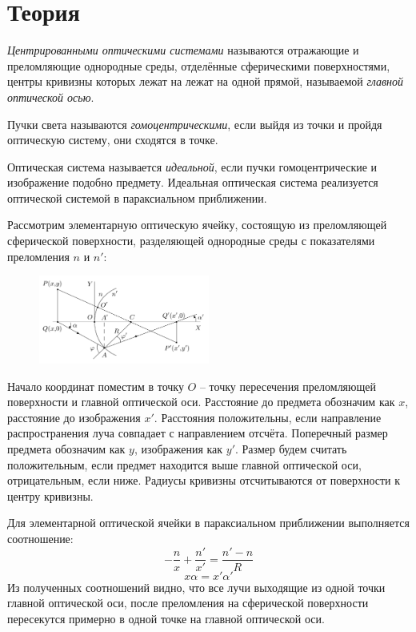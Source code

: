 \section*{Теория}

\textit{Центрированными оптическими системами} называются отражающие и преломляющие однородные среды, отделённые сферическими поверхностями, центры кривизны которых лежат на лежат на одной прямой, называемой \textit{главной оптической осью}.

Пучки света называются \textit{гомоцентрическими}, если выйдя из точки и пройдя оптическую систему, они сходятся в точке.

Оптическая система называется \textit{идеальной}, если пучки гомоцентрические и изображение подобно предмету. Идеальная оптическая система реализуется оптической системой в параксиальном приближении.

Рассмотрим элементарную оптическую ячейку, состоящую из преломляющей сферической поверхности, разделяющей однородные среды с показателями преломления $n$ и $n'$:

\begin{figure}[H]
	\centering
	\includegraphics[width=0.5\textwidth]{../Изображения/Оптическая ячейка.png}
\end{figure}

Начало координат поместим в точку $O$ -- точку пересечения преломляющей поверхности и главной оптической оси. Расстояние до предмета обозначим как $x$, расстояние до изображения $x'$. Расстояния положительны, если направление распространения луча совпадает с направлением отсчёта. Поперечный размер предмета обозначим как $y$, изображения как $y'$. Размер будем считать положительным, если предмет находится выше главной оптической оси, отрицательным, если ниже. Радиусы кривизны отсчитываются от поверхности к центру кривизны.

Для элементарной оптической ячейки в параксиальном приближении выполняется соотношение:
$$- \frac{n}{x} + \frac{n'}{x'} = \frac{n' - n}{R}$$
$$x \alpha = x' \alpha'$$
Из полученных соотношений видно, что все лучи выходящие из одной точки главной оптической оси, после преломления на сферической поверхности пересекутся примерно в одной точке на главной оптической оси.
